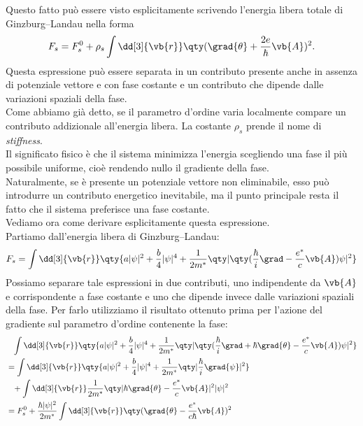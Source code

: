 Questo fatto può essere visto esplicitamente scrivendo l'energia libera totale di Ginzburg--Landau nella forma
\begin{equation*}
   F_s
   =
   F_s^0
   +
   \rho_s
   \int \dd[3]{\vb{r}}
   \qty(
      \grad{\theta}
      +
      \frac{2e}{\hbar}\vb{A}
   )^2.
\end{equation*}
Questa espressione può essere separata in un contributo presente anche in assenza di potenziale vettore e con fase costante e un contributo che dipende dalle variazioni spaziali della fase.\\
Come abbiamo già detto, se il parametro d'ordine varia localmente compare un contributo addizionale all'energia libera. La costante $\rho_s$ prende il nome di \emph{stiffness}.\\
Il significato fisico è che il sistema minimizza l'energia scegliendo una fase il più possibile uniforme, cioè rendendo nullo il gradiente della fase.\\
Naturalmente, se è presente un potenziale vettore non eliminabile, esso può introdurre un contributo energetico inevitabile, ma il punto principale resta il fatto che il sistema preferisce una fase costante.\\
Vediamo ora come derivare esplicitamente questa espressione.\\
Partiamo dall'energia libera di Ginzburg--Landau:
\begin{equation*}
   F_s
   =
   \int \dd[3]{\vb{r}}
   \qty{ a|\psi|^2
   + \frac{b}{4}|\psi|^4
   + \frac{1}{2m^*} \qty| \qty( \frac{\hbar}{i}\grad - \frac{e^*}{c}\vb{A} )\psi |^2 }
\end{equation*}
Possiamo separare tale espressioni in due contributi, uno indipendente da $\vb{A}$ e corrispondente a fase costante e uno che dipende invece dalle variazioni spaziali della fase. Per farlo utilizziamo il risultato ottenuto prima per l'azione del gradiente sul parametro d'ordine contenente la fase:
\begin{equation*}
   \begin{split}
      & \hphantom{=}
      \int \dd[3]{\vb{r}}
      \qty{
      a|\psi|^2
      +
      \frac{b}{4}|\psi|^4
      +
      \frac{1}{2m^*}
      \qty|
         \qty(
            \frac{\hbar}{i}\grad
            +
            \hbar\grad{\theta}
            -
            \frac{e^*}{c}\vb{A}
         )\psi
      |^2
      }
      \\
      &=
      \int \dd[3]{\vb{r}}
      \qty{
      a|\psi|^2
      +
      \frac{b}{4}|\psi|^4
      +
      \frac{1}{2m^*}
      \qty|
         \frac{\hbar}{i}\grad{\psi}
      |^2
      }
      \\
      & \hphantom{=}
      +
      \int \dd[3]{\vb{r}}
      \frac{1}{2m^*}
      \qty|
         \hbar\grad{\theta}
         -
         \frac{e^*}{c}\vb{A}
      |^2
      |\psi|^2
      \\
      &=
      F_s^0
      +
      \frac{\hbar|\psi|^2}{2m^*}
      \int \dd[3]{\vb{r}} \qty( \grad{\theta} - \frac{e^*}{c\hbar}\vb{A} )^2
   \end{split}
\end{equation*}
